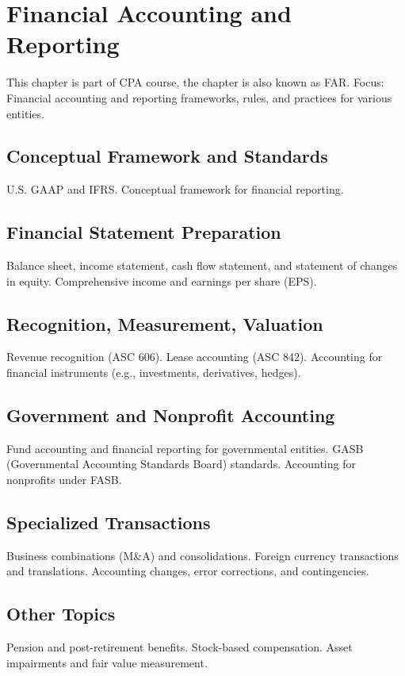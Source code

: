 \chapter{Financial Accounting and Reporting}
This chapter is part of CPA course, the chapter is also known as FAR.
Focus: Financial accounting and reporting frameworks, rules, and practices for various entities.

\section{Conceptual Framework and Standards}
U.S. GAAP and IFRS.
Conceptual framework for financial reporting.

\section{Financial Statement Preparation}
Balance sheet, income statement, cash flow statement, and statement of changes in equity.
Comprehensive income and earnings per share (EPS).

\section{Recognition, Measurement, Valuation}
Revenue recognition (ASC 606).
Lease accounting (ASC 842).
Accounting for financial instruments (e.g., investments, derivatives, hedges).

\section{Government and Nonprofit Accounting}
Fund accounting and financial reporting for governmental entities.
GASB (Governmental Accounting Standards Board) standards.
Accounting for nonprofits under FASB.

\section{Specialized Transactions}
Business combinations (M\&A) and consolidations.
Foreign currency transactions and translations.
Accounting changes, error corrections, and contingencies.

\section{Other Topics}
Pension and post-retirement benefits.
Stock-based compensation.
Asset impairments and fair value measurement.
